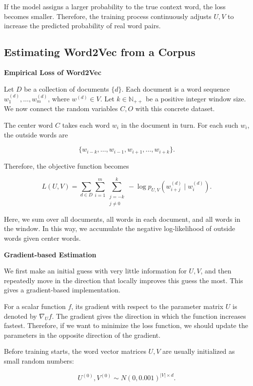 \documentclass[
  a4paper,
  10pt]{article}
\begin{document}
If the model assigns a larger probability to the true context word, the
loss becomes smaller. Therefore, the training process continuously
adjusts \(U,V\) to increase the predicted probability of real word
pairs.

\subsection{Estimating Word2Vec from a
Corpus}\label{estimating-word2vec-from-a-corpus}

\textbf{Empirical Loss of Word2Vec}

Let \(D\) be a collection of documents \(\{d\}\). Each document is a
word sequence \(w_1^{(d)},\dots,w_m^{(d)}\), where \(w^{(d)} \in V\).
Let \(k \in \mathbb N_{++}\) be a positive integer window size. We now
connect the random variables \(C,O\) with this concrete dataset.

The center word \(C\) takes each word \(w_i\) in the document in turn.
For each such \(w_i\), the outside words are

\[
\{w_{i-k},\dots,w_{i-1},w_{i+1},\dots,w_{i+k}\}.
\]

Therefore, the objective function becomes

\[
L(U,V)=
\sum_{d\in D}
\sum_{i=1}^{m}
\sum_{\substack{j=-k\\j\ne0}}^{k}
-\log p_{U,V}
\left(
w_{i+j}^{(d)}
\mid
w_i^{(d)}
\right).
\]

Here, we sum over all documents, all words in each document, and all
words in the window. In this way, we accumulate the negative
log-likelihood of outside words given center words.

\textbf{Gradient-based Estimation}

We first make an initial guess with very little information for \(U,V\),
and then repeatedly move in the direction that locally improves this
guess the most. This gives a gradient-based implementation.

For a scalar function \(f\), its gradient with respect to the parameter
matrix \(U\) is denoted by \(\nabla_U f\). The gradient gives the
direction in which the function increases fastest. Therefore, if we want
to minimize the loss function, we should update the parameters in the
opposite direction of the gradient.

Before training starts, the word vector matrices \(U,V\) are usually
initialized as small random numbers:

\[
U^{(0)},V^{(0)}\sim N(0,0.001)^{\lvert V\rvert\times d}.
\]
\end{document}
